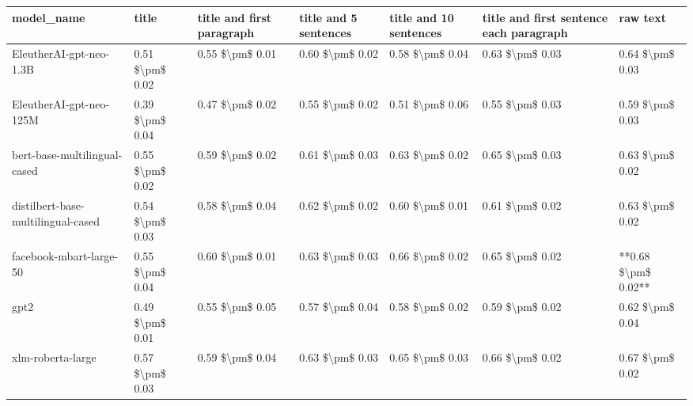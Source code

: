 \begin{tabular}{lllllll}
\toprule
                        model\_name &           title & title and first paragraph & title and 5 sentences & title and 10 sentences & title and first sentence each paragraph &            raw text \\
\midrule
           EleutherAI-gpt-neo-1.3B & 0.51 \$\textbackslash pm\$ 0.02 &           0.55 \$\textbackslash pm\$ 0.01 &       0.60 \$\textbackslash pm\$ 0.02 &        0.58 \$\textbackslash pm\$ 0.04 &                         0.63 \$\textbackslash pm\$ 0.03 &     0.64 \$\textbackslash pm\$ 0.03 \\
           EleutherAI-gpt-neo-125M & 0.39 \$\textbackslash pm\$ 0.04 &           0.47 \$\textbackslash pm\$ 0.02 &       0.55 \$\textbackslash pm\$ 0.02 &        0.51 \$\textbackslash pm\$ 0.06 &                         0.55 \$\textbackslash pm\$ 0.03 &     0.59 \$\textbackslash pm\$ 0.03 \\
      bert-base-multilingual-cased & 0.55 \$\textbackslash pm\$ 0.02 &           0.59 \$\textbackslash pm\$ 0.02 &       0.61 \$\textbackslash pm\$ 0.03 &        0.63 \$\textbackslash pm\$ 0.02 &                         0.65 \$\textbackslash pm\$ 0.03 &     0.63 \$\textbackslash pm\$ 0.02 \\
distilbert-base-multilingual-cased & 0.54 \$\textbackslash pm\$ 0.03 &           0.58 \$\textbackslash pm\$ 0.04 &       0.62 \$\textbackslash pm\$ 0.02 &        0.60 \$\textbackslash pm\$ 0.01 &                         0.61 \$\textbackslash pm\$ 0.02 &     0.63 \$\textbackslash pm\$ 0.02 \\
           facebook-mbart-large-50 & 0.55 \$\textbackslash pm\$ 0.04 &           0.60 \$\textbackslash pm\$ 0.01 &       0.63 \$\textbackslash pm\$ 0.03 &        0.66 \$\textbackslash pm\$ 0.02 &                         0.65 \$\textbackslash pm\$ 0.02 & **0.68 \$\textbackslash pm\$ 0.02** \\
                              gpt2 & 0.49 \$\textbackslash pm\$ 0.01 &           0.55 \$\textbackslash pm\$ 0.05 &       0.57 \$\textbackslash pm\$ 0.04 &        0.58 \$\textbackslash pm\$ 0.02 &                         0.59 \$\textbackslash pm\$ 0.02 &     0.62 \$\textbackslash pm\$ 0.04 \\
                 xlm-roberta-large & 0.57 \$\textbackslash pm\$ 0.03 &           0.59 \$\textbackslash pm\$ 0.04 &       0.63 \$\textbackslash pm\$ 0.03 &        0.65 \$\textbackslash pm\$ 0.03 &                         0.66 \$\textbackslash pm\$ 0.02 &     0.67 \$\textbackslash pm\$ 0.02 \\
\bottomrule
\end{tabular}
